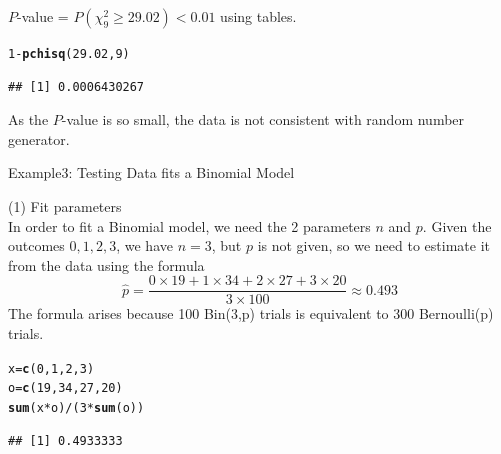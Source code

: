 \documentclass[t,xcolor=pdftex,dvipsnames,table]{beamer}
\makeatletter
\newcommand{\hlnum}[1]{\textcolor[rgb]{0.686,0.059,0.569}{#1}}%
\newcommand{\hlopt}[1]{\textcolor[rgb]{0,0,0}{#1}}%
\newcommand{\hlstd}[1]{\textcolor[rgb]{0.345,0.345,0.345}{#1}}%
\newcommand{\hlkwb}[1]{\textcolor[rgb]{0.69,0.353,0.396}{#1}}%
\newcommand{\hlkwd}[1]{\textcolor[rgb]{0.737,0.353,0.396}{\textbf{#1}}}%
\newenvironment{kframe}{%
 \def\at@end@of@kframe{}%
 \ifinner\ifhmode%
  \def\at@end@of@kframe{\end{minipage}}%
  \begin{minipage}{\columnwidth}%
 \fi\fi%
 \def\FrameCommand##1{\hskip\@totalleftmargin \hskip-\fboxsep
 \colorbox{shadecolor}{##1}\hskip-\fboxsep
     \hskip-\linewidth \hskip-\@totalleftmargin \hskip\columnwidth}%
 \MakeFramed {\advance\hsize-\width
   \@totalleftmargin\z@ \linewidth\hsize
   \@setminipage}}%
 {\par\unskip\endMakeFramed%
 \at@end@of@kframe}
\newenvironment{knitrout}{}{} %
\makeatother
\begin{document}
\begin{frame}[fragile]{}
 $P$-value = $P( \chi^2_{9} \geq 29.02) < 0.01$ using tables.

\begin{knitrout}
\color{fgcolor}\begin{kframe}
\begin{alltt}
\hlnum{1}\hlopt{-}\hlkwd{pchisq}\hlstd{(}\hlnum{29.02}\hlstd{,}\hlnum{9}\hlstd{)}
\end{alltt}
\begin{verbatim}
## [1] 0.0006430267
\end{verbatim}
\end{kframe}
\end{knitrout}

 As the $P$-value is so small, the data is not consistent with random number generator.
\end{frame} 


\begin{frame}[fragile]{Example3: Testing Data fits a Binomial Model}


\vspace{.5cm}
(1) Fit parameters \\
In order to fit a Binomial model, we need the 2 parameters $n$ and $p$. Given the outcomes $0,1,2,3$, we have $n=3$, but $p$ is not given, so we need to estimate it from the data using the formula
\[ \hat{p} = \frac{0 \times 19 + 1 \times 34 + 2 \times 27 + 3 \times 20}{3 \times 100} \approx 0.493   \]
The formula arises because 100 Bin(3,p) trials is equivalent to 300 Bernoulli(p) trials.

\begin{knitrout}
\color{fgcolor}\begin{kframe}
\begin{alltt}
\hlstd{x}\hlkwb{=}\hlkwd{c}\hlstd{(}\hlnum{0}\hlstd{,}\hlnum{1}\hlstd{,}\hlnum{2}\hlstd{,}\hlnum{3}\hlstd{)}
\hlstd{o}\hlkwb{=}\hlkwd{c}\hlstd{(}\hlnum{19}\hlstd{,}\hlnum{34}\hlstd{,}\hlnum{27}\hlstd{,}\hlnum{20}\hlstd{)}
\hlkwd{sum}\hlstd{(x}\hlopt{*}\hlstd{o)}\hlopt{/}\hlstd{(}\hlnum{3}\hlopt{*}\hlkwd{sum}\hlstd{(o))}
\end{alltt}
\begin{verbatim}
## [1] 0.4933333
\end{verbatim}
\end{kframe}
\end{knitrout}
\end{frame} 
\end{document}
